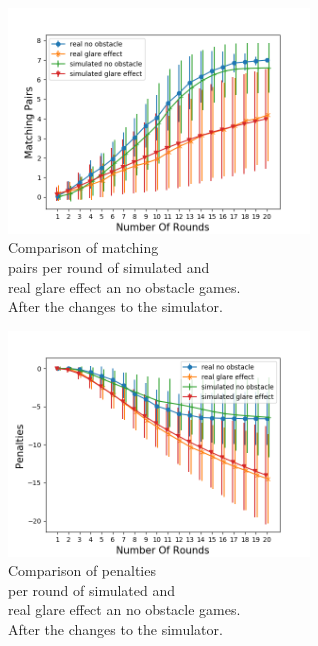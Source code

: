 \begin{minipage}{0.5\textwidth}
	\begin{figure}[H]
		\centering
		\includegraphics[width=8cm]{images/simulationOptimized1.png}
		\caption[Bild kurz]{Comparison of matching \\\hspace{0\textwidth}pairs per round of simulated and \\\hspace{0\textwidth}real glare effect an no obstacle games.\\\hspace{0\textwidth} After the changes to the simulator.}
		\label{fig:simOp1}
	\end{figure}
\end{minipage}
\begin{minipage}{0.5\textwidth}
	\begin{figure}[H]
		
		\includegraphics[width=8cm]{images/simulationOptimized2.png}
		\centering
		\caption[Bild kurz]{Comparison of penalties\\\hspace{0\textwidth} per round of simulated and\\\hspace{0\textwidth} real glare effect an no obstacle games.\\\hspace{0\textwidth} After the changes to the simulator.}
		\label{fig:simOp2}
	\end{figure}
\end{minipage} 

